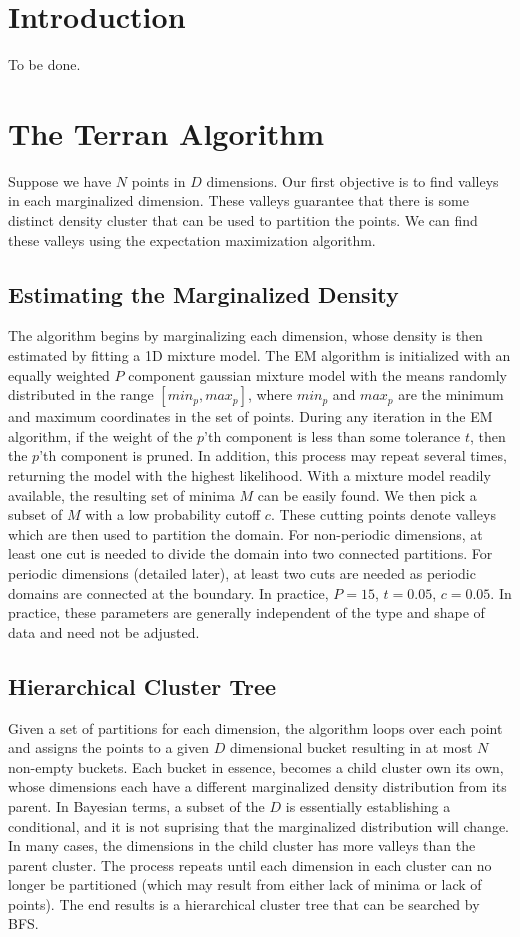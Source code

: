 \documentclass{acm_proc_article-sp}
\begin{document}
\section{Introduction}

To be done.

\section{The Terran Algorithm}
Suppose we have $N$ points in $D$ dimensions. Our first objective is to find valleys in each marginalized dimension. These valleys guarantee that there is some distinct density cluster that can be used to partition the points. We can find these valleys using the expectation maximization algorithm.

\subsection{Estimating the Marginalized Density}
The algorithm begins by marginalizing each dimension, whose density is then estimated by fitting a 1D mixture model. The EM algorithm is initialized with an equally weighted $P$ component gaussian mixture model with the means randomly distributed in the range $[min_p, max_p]$, where $min_p$ and $max_p$ are the minimum and maximum coordinates in the set of points. During any iteration in the EM algorithm, if the weight of the $p$'th component is less than some tolerance $t$, then the $p$'th component is pruned. In addition, this process may repeat several times, returning the model with the highest likelihood. With a mixture model readily available, the resulting set of minima $M$ can be easily found. We then pick a subset of $M$ with a low probability cutoff $c$. These cutting points denote valleys which are then used to partition the domain. For non-periodic dimensions, at least one cut is needed to divide the domain into two connected partitions. For periodic dimensions (detailed later), at least two cuts are needed as periodic domains are connected at the boundary. In practice, $P=15$, $t=0.05$, $c=0.05$. In practice, these parameters are generally independent of the type and shape of data and need not be adjusted. 

\subsection{Hierarchical Cluster Tree}
 Given a set of partitions for each dimension, the algorithm loops over each point and assigns the points to a given $D$ dimensional bucket resulting in at most $N$ non-empty buckets. Each bucket in essence, becomes a child cluster own its own, whose dimensions each have a different marginalized density distribution from its parent. In Bayesian terms, a subset of the $D$ is essentially establishing a conditional, and it is not suprising that the marginalized distribution will change. In many cases, the dimensions in the child cluster has more valleys than the parent cluster. The process repeats until each dimension in each cluster can no longer be partitioned (which may result from either lack of minima or lack of points). The end results is a hierarchical cluster tree that can be searched by BFS.
\end{document}
